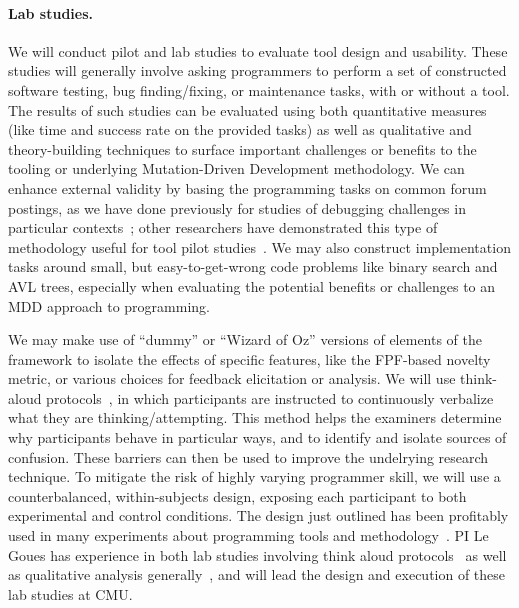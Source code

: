 \paragraph{Lab studies.}  
We will conduct pilot and lab studies to evaluate tool design
and usability. 
These studies will generally involve asking programmers to perform a set of
constructed software testing, bug finding/fixing, or maintenance tasks, with or
without a tool.  The results of such studies can be evaluated using both
quantitative measures (like time and success rate on the provided tasks) as well
as qualitative and theory-building techniques to surface
important challenges or benefits to the tooling or underlying Mutation-Driven
Development methodology.  We can enhance external validity by basing the
programming tasks on common forum postings, as we have done previously for
studies of debugging challenges in particular
contexts~\cite{frameworkDebugging}; other researchers have demonstrated this
type of methodology useful for tool pilot studies~\cite{sunshineDocumentation}.
We may also construct implementation tasks around small, but easy-to-get-wrong
code problems like binary search and AVL trees, especially when evaluating the
potential benefits or challenges to an MDD approach to programming.  

We may make use of ``dummy'' or ``Wizard of Oz'' versions of elements of the
framework to isolate the effects of specific features, like the FPF-based
novelty metric, or various choices for feedback elicitation or analysis. 
We will use
think-aloud protocols~\cite{thinkaloud}, in which participants are instructed to
continuously verbalize what they are thinking/attempting. This method helps the
examiners determine why participants behave in particular ways, and to identify
and isolate sources of confusion.  These barriers can then be used to improve
the undelrying research technique.  To mitigate the risk of highly varying
programmer skill, we will use a counterbalanced, within-subjects design,
exposing each participant to both experimental and control conditions.  The
design just outlined has been profitably used in many
experiments about programming tools and
methodology~\cite{Endrikat2014,Stylos07}.  PI Le Goues has experience in both
lab studies involving think aloud protocols~\cite{frameworkDebugging} as well as
qualitative analysis generally~\cite{testingUnderReview}, and will lead the
design and execution of these lab studies at CMU.

